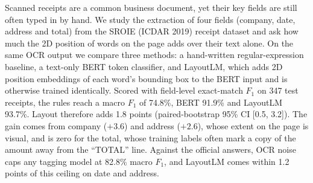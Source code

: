 
Scanned receipts are a common business document, yet their key fields
are still often typed in by hand. We study the extraction of four fields
(company, date, address and total) from the SROIE (ICDAR 2019) receipt
dataset and ask how much the 2D position of words on the page adds over
their text alone. On the same OCR output we compare three methods: a
hand-written regular-expression baseline, a text-only BERT token
classifier, and LayoutLM, which adds 2D position embeddings of each
word's bounding box to the BERT input and is otherwise trained
identically. Scored with field-level exact-match $F_1$ on 347 test
receipts, the rules reach a macro $F_1$ of 74.8\%, BERT 91.9\% and
LayoutLM 93.7\%. Layout therefore adds 1.8 points (paired-bootstrap 95\%
CI [0.5, 3.2]). The gain comes from company ($+3.6$) and address
($+2.6$), whose extent on the page is visual, and is zero for the total,
whose training labels often mark a copy of the amount away from the
``TOTAL'' line. Against the official answers, OCR noise caps any tagging
model at 82.8\% macro $F_1$, and LayoutLM comes within 1.2 points of
this ceiling on date and address.
